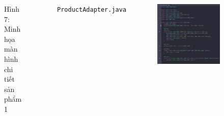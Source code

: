 \documentclass{beamer}
\begin{document}
\begin{frame}
\begin{columns}
\begin{figure}
            \caption{\centering\tiny{Hình 7: Minh họa màn hình chi tiết sản phẩm 1}}
        \end{figure}
        \indent \texttt{ProductAdapter.java}
        \begin{figure}
            \centering
            \includegraphics[width=\textwidth]{images/38.png}
        \end{figure}
    \end{columns}
\end{frame}
\end{document}
